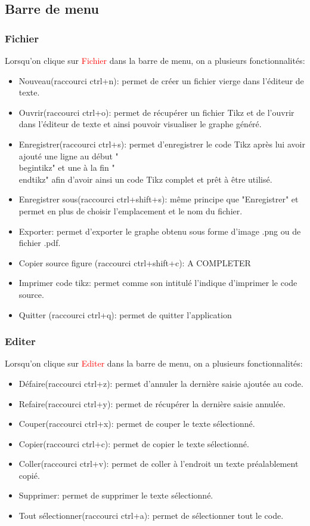 \documentclass[a4paper]{report}
\begin{document}
\subsection{Barre de menu}
 \subsubsection{Fichier}
Lorsqu'on clique sur \textcolor{red}{Fichier} dans la barre de menu, on a plusieurs fonctionnalités:
\begin{itemize}
 \item Nouveau(raccourci ctrl+n): permet de créer un fichier vierge dans l'éditeur de texte. 
 \item Ouvrir(raccourci ctrl+o): permet de récupérer un fichier Tikz et de l'ouvrir dans l'éditeur de texte et ainsi pouvoir visualiser le graphe généré.
 \item Enregistrer(raccourci ctrl+s): permet d'enregistrer le code Tikz après lui avoir ajouté une ligne au début "\\begin{tikz}" et une à la fin "\\end{tikz}" afin d'avoir ainsi un code Tikz complet et prêt à être utilisé.
 \item Enregistrer sous(raccourci ctrl+shift+s): même principe que "Enregistrer" et permet en plus de choisir l'emplacement et le nom du fichier.
 \item Exporter: permet d'exporter le graphe obtenu sous forme d'image .png ou de fichier .pdf.
 \item Copier source figure (raccourci ctrl+shift+c): A COMPLETER
 \item Imprimer code tikz: permet comme son intitulé l'indique d'imprimer le code source.
 \item Quitter (raccourci ctrl+q): permet de quitter l'application
\end{itemize}
 \subsubsection{Editer}
Lorsqu'on clique sur \textcolor{red}{Editer} dans la barre de menu, on a plusieurs fonctionnalités:
\begin{itemize}
 \item Défaire(raccourci ctrl+z): permet d'annuler la dernière saisie ajoutée au code. 
 \item Refaire(raccourci ctrl+y): permet de récupérer la dernière saisie annulée.
 \item Couper(raccourci ctrl+x): permet de couper le texte sélectionné.
 \item Copier(raccourci ctrl+c): permet de copier le texte sélectionné.
 \item Coller(raccourci ctrl+v): permet de coller à l'endroit un texte préalablement copié.
 \item Supprimer: permet de supprimer le texte sélectionné.
 \item Tout sélectionner(raccourci ctrl+a): permet de sélectionner tout le code.
\end{itemize}
\end{document}

